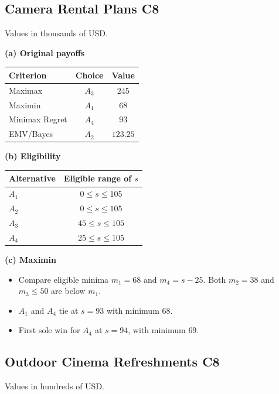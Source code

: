 {\small
\subsection{Camera Rental Plans \hfill C8}
\noindent Values in thousands of USD.

\noindent\begin{minipage}[t]{0.35\textwidth}
  \vspace{0pt}
  \textbf{(a) Original payoffs}\par\smallskip
  \setlength{\tabcolsep}{3pt}
  \begin{tabular}{@{}lcc@{}}
    \toprule
    Criterion & Choice & Value\\ \midrule
    Maximax & $A_3$ & $245$\\
    Maximin & $A_1$ & $68$\\
    Minimax Regret & $A_4$ & $93$\\
    EMV/Bayes & $A_2$ & $123.25$\\
    \bottomrule
  \end{tabular}
\end{minipage}\hfill
\begin{minipage}[t]{0.62\textwidth}
  \vspace{0pt}
  \textbf{(b) Eligibility}\par\smallskip
  \begin{tabular}{@{}lc@{}}
    \toprule
    Alternative & Eligible range of $s$\\ \midrule
    $A_1$ & $0\le s\le105$\\
    $A_2$ & $0\le s\le105$\\
    $A_3$ & $45\le s\le105$\\
    $A_4$ & $25\le s\le105$\\
    \bottomrule
  \end{tabular}\par\smallskip
  \textbf{(c) Maximin}
  \begin{itemize}[leftmargin=*,nosep]
    \item Compare eligible minima $m_1=68$ and $m_4=s-25$. Both $m_2=38$ and $m_3\le50$ are below $m_1$.
    \item $A_1$ and $A_4$ tie at $s=93$ with minimum $68$.
    \item First sole win for $A_4$ at $\boxed{s=94}$, with minimum $69$.
  \end{itemize}
\end{minipage}

\subsection{Outdoor Cinema Refreshments \hfill C8}
\noindent Values in hundreds of USD.

}
